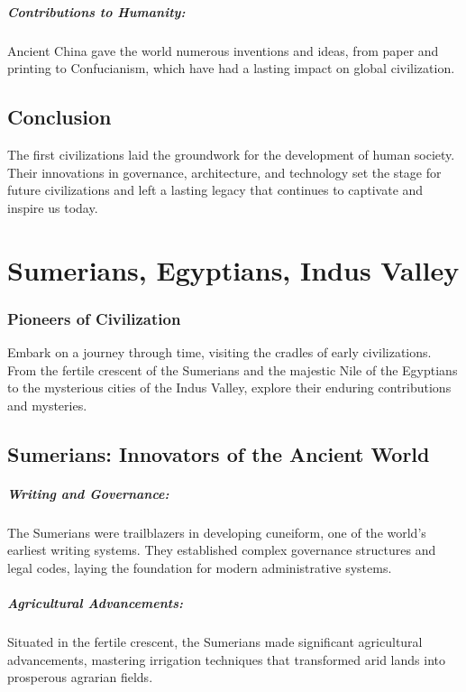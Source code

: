 \documentclass[a4paper,12pt]{book}
\begin{document}
\paragraph{Contributions to Humanity:}
Ancient China gave the world numerous inventions and ideas, from paper and printing to Confucianism, which have had a lasting impact on global civilization.

\section*{Conclusion}

The first civilizations laid the groundwork for the development of human society. Their innovations in governance, architecture, and technology set the stage for future civilizations and left a lasting legacy that continues to captivate and inspire us today.

\chapter{Sumerians, Egyptians, Indus Valley}
\subsection*{Pioneers of Civilization}
Embark on a journey through time, visiting the cradles of early civilizations. From the fertile crescent of the Sumerians and the majestic Nile of the Egyptians to the mysterious cities of the Indus Valley, explore their enduring contributions and mysteries.

\section*{Sumerians: Innovators of the Ancient World}

\paragraph{Writing and Governance:}
The Sumerians were trailblazers in developing cuneiform, one of the world's earliest writing systems. They established complex governance structures and legal codes, laying the foundation for modern administrative systems.

\paragraph{Agricultural Advancements:}
Situated in the fertile crescent, the Sumerians made significant agricultural advancements, mastering irrigation techniques that transformed arid lands into prosperous agrarian fields.
\end{document}
